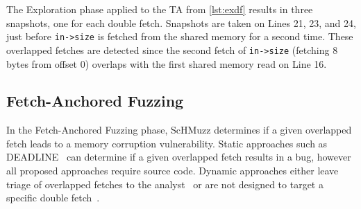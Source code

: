 \documentclass[conference]{IEEEtran}
\newcommand{\sysname}{ScHMuzz\xspace}
\newcommand{\stageone}{Exploration\xspace}
\newcommand{\stagetwo}{Fetch-Anchored Fuzzing\xspace}
\begin{document}


 
The \stageone phase applied to the TA from \autoref{lst:exdf} results 
in three snapshots, one for each double fetch. Snapshots are taken on Lines 21, 23, and 24, 
just before \texttt{in->size} is fetched from the shared memory for a second time. These overlapped fetches 
are detected since the second fetch of \texttt{in->size} (fetching 8 bytes from offset 0) overlaps with the first shared memory read on Line 16. 


\subsection{\stagetwo}
In the \stagetwo phase, \sysname determines if a given overlapped fetch leads to a memory corruption vulnerability. 
Static approaches such as DEADLINE~\cite{deadline} 
can determine if a given overlapped fetch results in a bug, however all proposed 
approaches require source code. Dynamic approaches  
either leave triage of overlapped fetches to the analyst~\cite{bochspwn} or are 
not designed to target a specific double fetch~\cite{decaf,chen2024enclavefuzz,morphuzz}.
\end{document}
